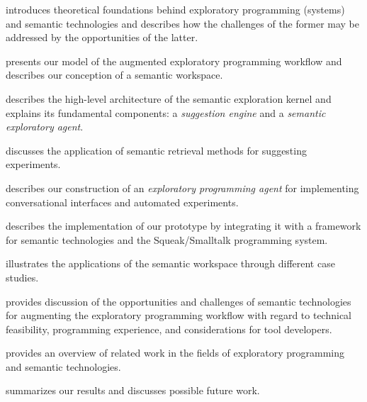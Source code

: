 \begin{description}[noextralabelsep]
	\item[\cref{cha:background}] introduces theoretical foundations behind exploratory programming (systems) and semantic technologies and describes how the challenges of the former may be addressed by the opportunities of the latter.
	\item[\cref{cha:approach}] presents our model of the augmented exploratory programming workflow and describes our conception of a semantic workspace.
	\item[\cref{cha:design}] describes the high-level architecture of the semantic exploration kernel and explains its fundamental components: a \emph{suggestion engine} and a \emph{semantic exploratory agent}.
	\item[\cref{cha:suggestions}] discusses the application of semantic retrieval methods for suggesting experiments.
	\item[\cref{cha:agent}] describes our construction of an \emph{exploratory programming agent} for implementing conversational interfaces and automated experiments.
	\item[\cref{cha:implementation}] describes the implementation of our prototype by integrating it with a framework for semantic technologies and the Squeak/Smalltalk programming system.
	\item[\cref{cha:application}] illustrates the applications of the semantic workspace through different case studies.
	\item[\cref{cha:discussion}] provides discussion of the opportunities and challenges of semantic technologies for augmenting the exploratory programming workflow with regard to technical feasibility, programming experience, and considerations for tool developers.
	\item[\cref{cha:related_work}] provides an overview of related work in the fields of exploratory programming and semantic technologies.
	\item[\cref{cha:conclusion}] summarizes our results and discusses possible future work.
\end{description}

